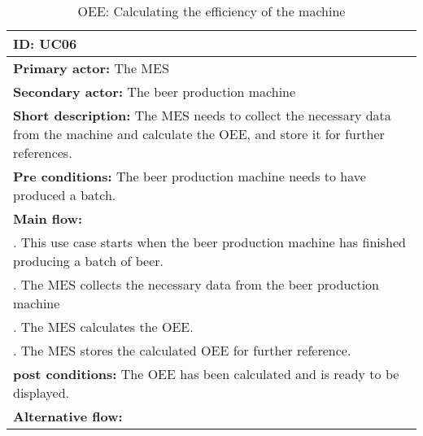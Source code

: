 \begin{table}[ht]
    \begin{tabularx}{\textwidth}{|>{\RaggedRight}X|}
        \hline
        \textbf{ID:} UC06  \\
        \hline
        \textbf{Primary actor:} The MES \\
        \hline
        \textbf{Secondary actor:} The beer production machine \\
        \hline
        \textbf{Short description:} The MES needs to collect the necessary data
        from the machine and calculate the OEE, and store it for
        further references. \\
        \hline
        \textbf{Pre conditions:} The beer production machine needs to have
        produced a batch. \\
        \hline
        \textbf{Main flow:} \\
        	1. This use case starts when the beer production machine has
        	finished producing a batch of beer. \\
			2. The MES collects the necessary data from the beer production
			machine \\
			3. The MES calculates the OEE. \\
			4. The MES stores the calculated OEE for further reference. \\ 
		\hline
        \textbf{post conditions:} The OEE has been calculated and is ready to
        be displayed. \\
        \hline
        \textbf{Alternative flow:} \\
        \hline
    \end{tabularx}
    \caption{OEE: Calculating the efficiency of the machine}
    \label{table:usecase_oee}
\end{table}

